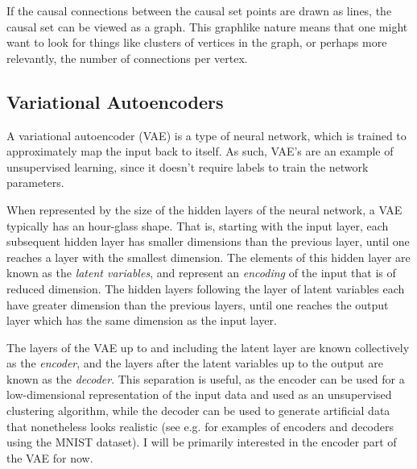 \documentclass[letterpaper,10pt]{article}
\begin{document}
If the causal connections between the causal set points are drawn as lines, the causal set can be viewed as a graph.  This graphlike nature means that 
one might want to look for things like clusters of vertices in the graph, or perhaps more relevantly, the number of connections per vertex.

\subsection{Variational Autoencoders}

A variational autoencoder \cite{vae} (VAE) is a type of neural network, which is trained to approximately map the input back to itself.  As such, 
VAE's are an example of unsupervised learning, since it doesn't require labels to train the network parameters.

When represented by the size of the hidden layers of the neural network, a VAE typically has an hour-glass shape.  That is, starting with the input layer, 
each subsequent hidden layer has smaller dimensions than the previous layer, until one reaches a layer with the smallest dimension.  
The elements of this hidden layer are known as the {\it latent variables}, and represent an {\it encoding} of the input that is of reduced dimension.  
The hidden layers following the layer of latent variables each have greater dimension than the previous layers, until one reaches the output layer which 
has the same dimension as the input layer.

The layers of the VAE up to and including the latent layer are known collectively as the {\it encoder}, and the layers after the latent variables 
up to the output are known as the {\it decoder}.  This separation is useful, as the encoder can be used for a low-dimensional representation of 
the input data and used as an unsupervised clustering algorithm, while the decoder can be used to generate artificial data that nonetheless looks 
realistic (see e.g. \cite{vaemnist} for examples of encoders and decoders using the MNIST \cite{mnist} dataset).  I will be primarily interested in 
the encoder part of the VAE for now.
\end{document}
